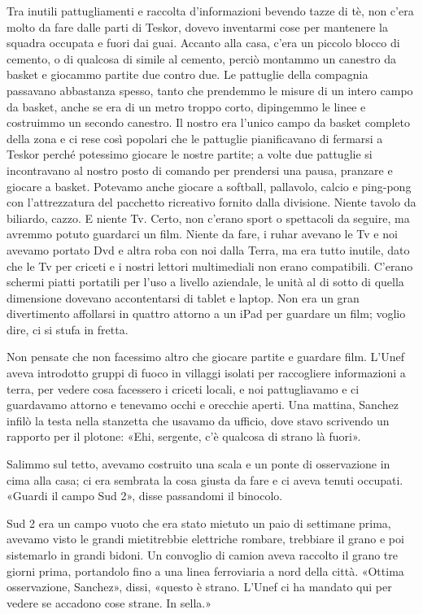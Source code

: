 Tra inutili pattugliamenti e raccolta d'informazioni bevendo tazze di
tè, non c'era molto da fare dalle parti di Teskor, dovevo inventarmi
cose per mantenere la squadra occupata e fuori dai guai. Accanto alla
casa, c'era un piccolo blocco di cemento, o di qualcosa di simile al
cemento, perciò montammo un canestro da basket e giocammo partite due
contro due. Le pattuglie della compagnia passavano abbastanza spesso,
tanto che prendemmo le misure di un intero campo da basket, anche se era
di un metro troppo corto, dipingemmo le linee e costruimmo un secondo
canestro. Il nostro era l'unico campo da basket completo della zona e ci
rese così popolari che le pattuglie pianificavano di fermarsi a Teskor
perché potessimo giocare le nostre partite; a volte due pattuglie si
incontravano al nostro posto di comando per prendersi una pausa,
pranzare e giocare a basket. Potevamo anche giocare a softball,
pallavolo, calcio e ping-pong con l'attrezzatura del pacchetto
ricreativo fornito dalla divisione. Niente tavolo da biliardo, cazzo. E
niente Tv. Certo, non c'erano sport o spettacoli da seguire, ma avremmo
potuto guardarci un film. Niente da fare, i ruhar avevano le Tv e noi
avevamo portato Dvd e altra roba con noi dalla Terra, ma era tutto
inutile, dato che le Tv per criceti e i nostri lettori multimediali non
erano compatibili. C'erano schermi piatti portatili per l'uso a livello
aziendale, le unità al di sotto di quella dimensione dovevano
accontentarsi di tablet e laptop. Non era un gran divertimento
affollarsi in quattro attorno a un iPad per guardare un film; voglio
dire, ci si stufa in fretta.

Non pensate che non facessimo altro che giocare partite e guardare film.
L'Unef aveva introdotto gruppi di fuoco in villaggi isolati per
raccogliere informazioni a terra, per vedere cosa facessero i criceti
locali, e noi pattugliavamo e ci guardavamo attorno e tenevamo occhi e
orecchie aperti. Una mattina, Sanchez infilò la testa nella stanzetta
che usavamo da ufficio, dove stavo scrivendo un rapporto per il plotone:
«Ehi, sergente, c'è qualcosa di strano là fuori».

Salimmo sul tetto, avevamo costruito una scala e un ponte di
osservazione in cima alla casa; ci era sembrata la cosa giusta da fare e
ci aveva tenuti occupati. «Guardi il campo Sud 2», disse passandomi il
binocolo.

Sud 2 era un campo vuoto che era stato mietuto un paio di settimane
prima, avevamo visto le grandi mietitrebbie elettriche rombare,
trebbiare il grano e poi sistemarlo in grandi bidoni. Un convoglio di
camion aveva raccolto il grano tre giorni prima, portandolo fino a una
linea ferroviaria a nord della città. «Ottima osservazione, Sanchez»,
dissi, «questo è strano. L'Unef ci ha mandato qui per vedere se accadono
cose strane. In sella.»

